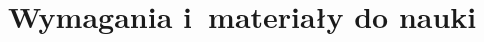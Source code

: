 \documentclass[10pt,t]{beamer}
\begin{document}


















\section{Wymagania i~materiały do nauki}
\end{document}
